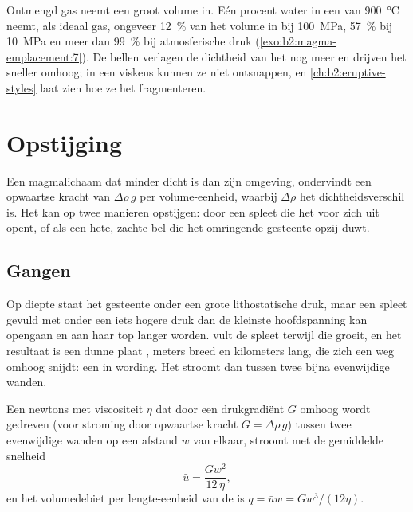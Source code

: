 Ontmengd gas neemt een groot volume in. Eén procent water in een  van
\qty{900}{\celsius} neemt, als ideaal gas, ongeveer \qty{12}{\percent} van het
volume in bij \qty{100}{MPa}, \qty{57}{\percent} bij \qty{10}{MPa} en meer dan
\qty{99}{\percent} bij atmosferische druk (\cref{exo:b2:magma-emplacement:7}). De bellen verlagen de
dichtheid van het  nog meer en drijven het sneller omhoog; in een viskeus 
kunnen ze niet ontsnappen, en \cref{ch:b2:eruptive-styles} laat zien hoe ze het fragmenteren.

\section{Opstijging}

Een magmalichaam dat minder dicht is dan zijn omgeving, ondervindt een opwaartse kracht van
$\Delta\rho\,g$ per volume-eenheid, waarbij $\Delta\rho$ het dichtheidsverschil is. Het
kan op twee manieren opstijgen: door een spleet die het voor zich uit opent, of als een hete,
zachte bel die het omringende gesteente opzij duwt.

\subsection{Gangen}

Op diepte staat het gesteente onder een grote lithostatische druk, maar een spleet gevuld
met  onder een iets hogere druk dan de kleinste hoofdspanning kan
opengaan en aan haar top langer worden.  vult de spleet terwijl die groeit, en het resultaat
is een dunne plaat , meters breed en kilometers lang, die zich een weg
omhoog snijdt: een  in wording. Het  stroomt dan tussen twee bijna evenwijdige
wanden.

\begin{proposition}\label{prop:b2:magma-emplacement:poiseuille}
Een newtons  met viscositeit $\eta$ dat door een drukgradiënt $G$ omhoog wordt gedreven
(voor stroming door opwaartse kracht $G = \Delta\rho\,g$) tussen twee evenwijdige wanden op een afstand $w$
van elkaar, stroomt met de gemiddelde snelheid
\[
\bar u = \frac{G w^2}{12\,\eta},
\]
en het volumedebiet per lengte-eenheid van de  is $q = \bar u w = G w^3/(12\eta)$.
\end{proposition}

